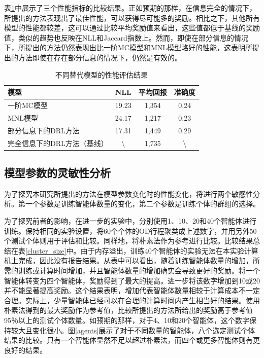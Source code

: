表\ref{tab:eva}中展示了三个性能指标的比较结果。正如预期的那样，在信息完全的情况下，所提出的方法表现出了最佳性能，可以获得尽可能多的奖励。相比之下，其他所有模型的性能都较差，这可以通过比较平均奖励值来看出，这些值都低于基线的奖励值，类似的趋势也反映在NLL和Jaccard指数上。然而，即使在部分信息的情况下，所提出的方法仍然表现出比一阶MC模型和MNL模型略好的性能，这表明所提出的方法即使在存在部分信息的情况下，仍然是有效的。

\begin{table}[htbp]
\centering
\caption{不同替代模型的性能评估结果}
\label{tab:eva}
\renewcommand{\arraystretch}{1.2} %
\setlength{\tabcolsep}{8mm} %
\small %

\begin{tabular}{lccc}
\toprule
模型 & NLL & 平均回报 & 准确度 \\
\midrule
一阶MC模型 & 19.23 & 1,354 & 0.24 \\
MNL模型 & 24.17 & 1,217 & 0.23 \\
部分信息下的DRL方法 & 17.31 & 1,449 & 0.29 \\
完全信息下的DRL方法（基线） & \textbackslash{} & 1,735 & \textbackslash{} \\
\bottomrule
\end{tabular}
\end{table}

\subsection{模型参数的灵敏性分析}

为了探究本研究所提出的方法在模型参数变化时的性能变化，将进行两个敏感性分析。第一个参数是训练智能体数量的变化，第二个参数是训练个体的群组的选择。

为了探究前者的影响，在进一步的实验中，分别使用1、10、20和40个智能体进行训练。保持相同的实验设置，将60个个体的OD行程聚类成上述数字，并用另外50个测试个体则用于评估和比较。同样地，将朴素法作为参考进行比较。比较结果总结在表\ref{cluster_size}中。由于内存溢出，训练40个智能体的实验无法在本实验计算机上完成，因此没有报告结果。从表中可以看出，随着训练智能体数量的增加，所需的训练或计算时间增加，并且智能体数量的增加确实会导致更好的奖励。将一个智能体转变为四个智能体，奖励得到了最大的提高。进一步将该数字增加到10或20并不能显著提高奖励。这个结果表明，增加代表智能体数量相较于计算成本不一定合理。实际上，少量智能体已经可以在合理的计算时间内产生相当好的结果。使用朴素法得到的最大奖励作为参考值，比较所提出的方法所给出的奖励高于参考值95％以上的测试个体数量。如预期的那样，对于4、10和20个智能体，这个数字保持较大且变化很小。图\ref{agents}展示了对于不同数量的智能体，八个选定测试个体结果的比较。只有一个智能体显然不足以超过朴素法，而四个或更多智能体则有更良好的结果。

